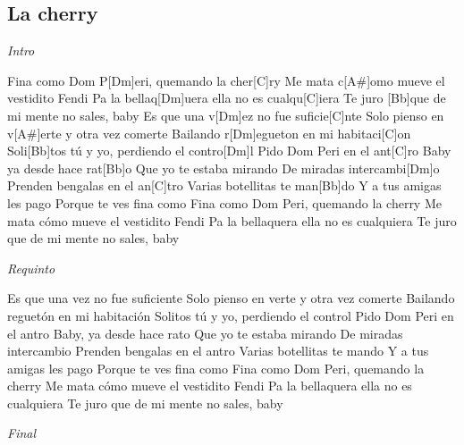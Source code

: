 \subsection{La cherry}
\noindent

\vspace{1cm}

\begin{guitar}
	\begin{multicols}{2}

		\textit{Intro}

		Fina como Dom P[Dm]eri, quemando la cher[C]ry
		Me mata c[A#]omo mueve el vestidito Fendi
		Pa la bellaq[Dm]uera ella no es cualqu[C]iera
		Te juro [Bb]que de mi mente no sales, baby
		Es que una v[Dm]ez no fue suficie[C]nte
		Solo pienso en v[A#]erte y otra vez comerte
		Bailando r[Dm]egueton en mi habitaci[C]on
		Soli[Bb]tos tú y yo, perdiendo el contro[Dm]l 
		Pido Dom Peri en el ant[C]ro
		Baby ya desde hace rat[Bb]o
	Que yo te estaba mirando 
	De miradas intercambi[Dm]o
	Prenden bengalas en el an[C]tro
	Varias botellitas te man[Bb]do
	Y a tus amigas les pago
	Porque te ves fina como
	Fina como Dom Peri, quemando la cherry
	Me mata cómo mueve el vestidito Fendi
	Pa la bellaquera ella no es cualquiera
	Te juro que de mi mente no sales, baby

	\par
	\textit{Requinto}
	\par

	Es que una vez no fue suficiente
	Solo pienso en verte y otra vez comerte
	Bailando reguetón en mi habitación
	Solitos tú y yo, perdiendo el control
	Pido Dom Peri en el antro
	Baby, ya desde hace rato
	Que yo te estaba mirando
	De miradas intercambio
	Prenden bengalas en el antro
	Varias botellitas te mando
	Y a tus amigas les pago
	Porque te ves fina como
	Fina como Dom Peri, quemando la cherry
	Me mata cómo mueve el vestidito Fendi
	Pa la bellaquera ella no es cualquiera
	Te juro que de mi mente no sales, baby

		\textit{Final}

	\end{multicols}
\end{guitar}

